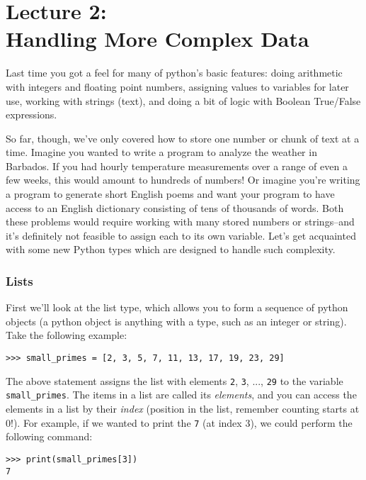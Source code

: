 
\part*{Lecture 2: \\ Handling More Complex Data}

Last time you got a feel for many of python's basic features: doing arithmetic with integers and floating point numbers, assigning values to variables for later use, working with strings (text), and doing a bit of logic with Boolean True/False expressions.

So far, though, we've only covered how to store one number or chunk of text at a time. Imagine you wanted to write a program to analyze the weather in Barbados. If you had hourly temperature measurements over a range of even a few weeks, this would amount to hundreds of numbers! Or imagine you're writing a program to generate short English poems and want your program to have access to an English dictionary consisting of tens of thousands of words. Both these problems would require working with many stored numbers or strings--and it's definitely not feasible to assign each to its own variable. Let's get acquainted with some new Python types which are designed to handle such complexity.


\section*{Lists}

First we'll look at the list type, which allows you to form a sequence of python objects (a python object is anything with a type, such as an integer or string). Take the following example:

\begin{lstlisting}[numbers=none]
>>> small_primes = [2, 3, 5, 7, 11, 13, 17, 19, 23, 29]
\end{lstlisting}

The above statement assigns the list with elements \texttt{2}, \texttt{3}, ..., \texttt{29} to the variable \texttt{small\_primes}. The items in a list are called its \emph{elements}, and you can access the elements in a list by their \emph{index} (position in the list, remember counting starts at 0!). For example, if we wanted to print the \texttt{7} (at index 3), we could perform the following command:

\begin{lstlisting}[numbers=none]
>>> print(small_primes[3])
7
\end{lstlisting}

